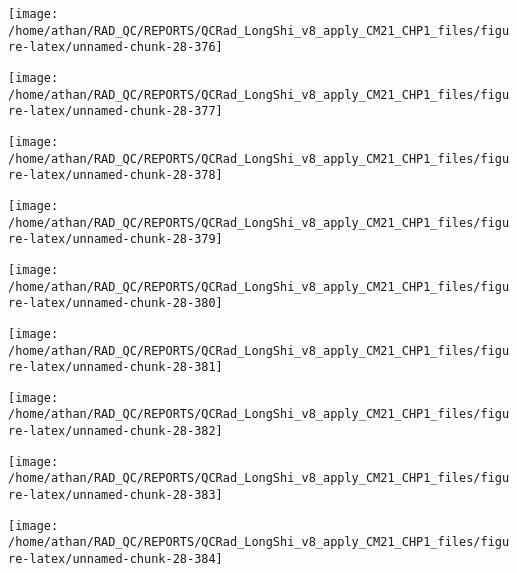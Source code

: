 \documentclass[
  10pt,
  a4paper,oneside]{article}
\begin{document}
\begin{center}\texttt{[image: /home/athan/RAD\_QC/REPORTS/QCRad\_LongShi\_v8\_apply\_CM21\_CHP1\_files/figure-latex/unnamed-chunk-28-376]} \end{center}

\begin{center}\texttt{[image: /home/athan/RAD\_QC/REPORTS/QCRad\_LongShi\_v8\_apply\_CM21\_CHP1\_files/figure-latex/unnamed-chunk-28-377]} \end{center}

\begin{center}\texttt{[image: /home/athan/RAD\_QC/REPORTS/QCRad\_LongShi\_v8\_apply\_CM21\_CHP1\_files/figure-latex/unnamed-chunk-28-378]} \end{center}

\begin{center}\texttt{[image: /home/athan/RAD\_QC/REPORTS/QCRad\_LongShi\_v8\_apply\_CM21\_CHP1\_files/figure-latex/unnamed-chunk-28-379]} \end{center}

\begin{center}\texttt{[image: /home/athan/RAD\_QC/REPORTS/QCRad\_LongShi\_v8\_apply\_CM21\_CHP1\_files/figure-latex/unnamed-chunk-28-380]} \end{center}

\begin{center}\texttt{[image: /home/athan/RAD\_QC/REPORTS/QCRad\_LongShi\_v8\_apply\_CM21\_CHP1\_files/figure-latex/unnamed-chunk-28-381]} \end{center}

\begin{center}\texttt{[image: /home/athan/RAD\_QC/REPORTS/QCRad\_LongShi\_v8\_apply\_CM21\_CHP1\_files/figure-latex/unnamed-chunk-28-382]} \end{center}

\begin{center}\texttt{[image: /home/athan/RAD\_QC/REPORTS/QCRad\_LongShi\_v8\_apply\_CM21\_CHP1\_files/figure-latex/unnamed-chunk-28-383]} \end{center}

\begin{center}\texttt{[image: /home/athan/RAD\_QC/REPORTS/QCRad\_LongShi\_v8\_apply\_CM21\_CHP1\_files/figure-latex/unnamed-chunk-28-384]} \end{center}
\end{document}
